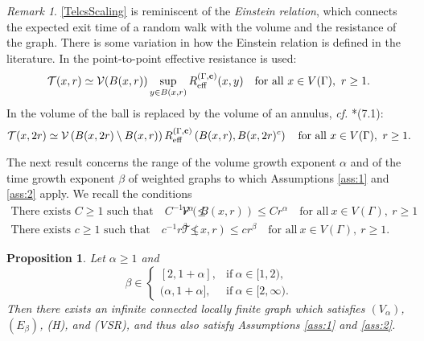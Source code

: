 \documentclass[11pt]{amsart}
\theoremstyle{plain}
\newtheorem{proposition}[lemma]{Proposition}
\theoremstyle{definition}
\theoremstyle{remark}
\newtheorem{remark}[lemma]{Remark}
\begin{document}
%

\begin{remark}
\eqref{TelcsScaling} is reminiscent of the \emph{Einstein relation}, which connects the expected exit time of a random walk with the volume and the resistance of the graph. There is some variation in how the Einstein relation is defined in the literature. In \cite{KigamiMemoir} the point-to-point effective resistance is used:
\[
\mathcal{T}(x,r) \simeq  \mathcal{V}(B(x,r))\sup_{y\in B(x,r)} R_{\rm eff}^{(\Gamma,{\bf c})}(x,y) \quad \text{for all}~x\in V(\Gamma), ~r\geq 1.
\]
 In \cite{TelcsBook} the volume of the ball is replaced by the volume of an annulus, \emph{cf.\@} \cite{TelcsBook}*{(7.1)}:
\[
\mathcal{T}(x, 2r) \simeq \mathcal{V}\left(B(x,2r) \setminus B(x,r)\right) R_{\rm eff}^{(\Gamma, {\bf c})}\left(B(x,r), B(x,2r)^c\right) \quad \text{for all}~x\in V(\Gamma),~r\geq 1.
\]
\end{remark}

The next result concerns the range of the volume growth exponent $\alpha$ and of the time growth exponent $\beta$ of weighted graphs to which Assumptions \ref{ass:1} and \ref{ass:2} apply. We recall the conditions
\begin{align}
\tag{$V_\alpha$} \text{There exists $C\geq 1$ such that} \quad  C^{-1} r^\alpha \leq &\mathcal{V}(B(x,r)) \leq C r^\alpha \quad \text{for all}~x\in V(\Gamma), ~r\geq 1\\
\tag{$E_\beta$} \text{There exists $c\geq 1$ such that} \quad  c^{-1} r^\beta \leq &\mathcal{T}(x,r)\leq c r^\beta \quad \text{for all}~ x\in V(\Gamma), ~r\geq 1.
\end{align}

\begin{proposition}
\label{prop:BarlowValues}
Let $\alpha \geq 1$ and 
\[
\beta \in \left\{\begin{array}{ll} [2, 1+\alpha], & \text{if}~\alpha \in [1,2),\\ (\alpha, 1+\alpha], &\text{if}~\alpha \in [2,\infty).\end{array} \right.
\]
Then there exists an infinite connected locally finite graph which satisfies $(V_\alpha)$, $(E_\beta)$, (H), and (VSR), and thus also satisfy Assumptions \ref{ass:1} and \ref{ass:2}.
\end{proposition}
\end{document}

